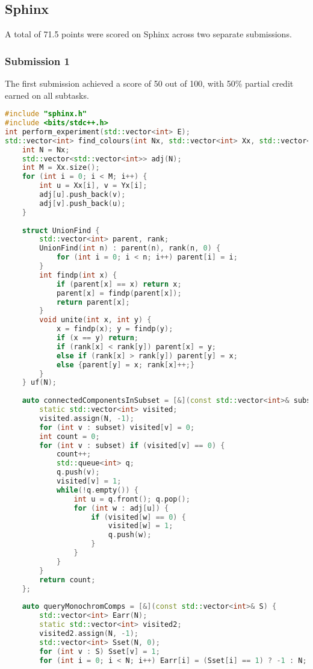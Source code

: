 \subsection{Sphinx}
A total of 71.5 points were scored on Sphinx across two separate submissions.

\subsubsection{Submission 1}
The first submission achieved a score of 50 out of 100, with 50\% partial credit earned on all subtasks.

\begin{lstlisting}[language=C++]
#include "sphinx.h"
#include <bits/stdc++.h>
int perform_experiment(std::vector<int> E);
std::vector<int> find_colours(int Nx, std::vector<int> Xx, std::vector<int> Yx) {
    int N = Nx;
    std::vector<std::vector<int>> adj(N);
    int M = Xx.size();
    for (int i = 0; i < M; i++) {
        int u = Xx[i], v = Yx[i];
        adj[u].push_back(v);
        adj[v].push_back(u);
    }
 
    struct UnionFind {
        std::vector<int> parent, rank;
        UnionFind(int n) : parent(n), rank(n, 0) {
            for (int i = 0; i < n; i++) parent[i] = i;
        }
        int findp(int x) {
            if (parent[x] == x) return x;
            parent[x] = findp(parent[x]);
            return parent[x];
        }
        void unite(int x, int y) {
            x = findp(x); y = findp(y);
            if (x == y) return;
            if (rank[x] < rank[y]) parent[x] = y;
            else if (rank[x] > rank[y]) parent[y] = x;
            else {parent[y] = x; rank[x]++;}
        }
    } uf(N);
 
    auto connectedComponentsInSubset = [&](const std::vector<int>& subset) {
        static std::vector<int> visited;
        visited.assign(N, -1);
        for (int v : subset) visited[v] = 0;
        int count = 0;
        for (int v : subset) if (visited[v] == 0) {
            count++;
            std::queue<int> q;
            q.push(v);
            visited[v] = 1;
            while(!q.empty()) {
                int u = q.front(); q.pop();
                for (int w : adj[u]) {
                    if (visited[w] == 0) {
                        visited[w] = 1;
                        q.push(w);
                    }
                }
            }
        }
        return count;
    };
 
    auto queryMonochromComps = [&](const std::vector<int>& S) {
        std::vector<int> Earr(N);
        static std::vector<int> visited2;
        visited2.assign(N, -1);
        std::vector<int> Sset(N, 0);
        for (int v : S) Sset[v] = 1;
        for (int i = 0; i < N; i++) Earr[i] = (Sset[i] == 1) ? -1 : N;
 

\end{lstlisting}
